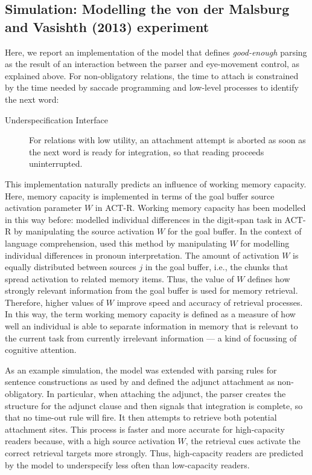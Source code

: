 \documentclass{cambridge7A}\usepackage[]{graphicx}\usepackage[]{color}
\begin{document}
\subsection{Simulation: Modelling the von der Malsburg and Vasishth (2013) experiment}

Here, we report an implementation of the model that defines \emph{good-enough} parsing as the result of an interaction between the parser and eye-movement control, as explained above. For non-obligatory relations, the time to attach is constrained by the time needed by saccade programming and low-level processes to identify the next word:

\begin{description}
  \item[Underspecification Interface]  For relations with low utility, an attachment attempt is aborted as soon as the next word is ready for integration, so that reading proceeds uninterrupted.
\end{description}

This implementation naturally predicts an influence of working memory capacity. Here, memory capacity is implemented in terms of the  goal buffer source activation parameter $W$ in ACT-R.
Working memory capacity has been modelled in this way before: \cite{DailyEtAl2001} modelled individual differences in the digit-span task \citep{LovettRederLebiere1999} in ACT-R by manipulating the source activation $W$ for the goal buffer.  
In the context of language comprehension, \cite{VanRijVanRijnHendriks2013} used this method by manipulating $W$ for modelling individual differences in pronoun interpretation.
The amount of activation $W$ is equally distributed between sources $j$ in the goal buffer, i.e., the chunks that spread activation to related memory items. Thus, the value of $W$ defines how strongly relevant information from the goal buffer is used for memory retrieval. Therefore, higher values of $W$ improve speed and accuracy of retrieval processes. In this way, the term working memory capacity  is defined as a measure of how well an individual is able to separate information in memory that is relevant to the current task from currently irrelevant information --- a kind of focussing of cognitive attention.

As an example simulation, the \cite{LewisVasishth2005} model was extended with parsing rules for sentence constructions as used by \cite{MalsburgVasishth2013} and defined the adjunct attachment as non-obligatory.
In particular, when attaching the adjunct, the parser creates the structure for the adjunct clause and then signals that integration is complete, so that no time-out rule will fire. It then attempts to retrieve both potential attachment sites. 
This process is faster and more accurate for high-capacity readers because, with a high source activation $W$, the retrieval cues  
activate the correct retrieval targets more strongly.
Thus, high-capacity readers are predicted by the model to underspecify less often than low-capacity readers.
\end{document}
